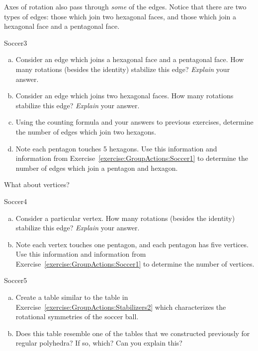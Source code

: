 Axes of rotation also pass through \emph{some} of the edges. Notice that there are two types of edges: those which join two hexagonal faces, and those which join a hexagonal face and a pentagonal face.

\begin{exercise}{Soccer3}
\begin{enumerate}[(a)]
\item
Consider an edge which joins a hexagonal face and a pentagonal face. How many rotations (besides the identity) stabilize this edge?  \emph{Explain} your answer.
\item
Consider an edge which joins two hexagonal faces. How many rotations stabilize this edge?  \emph{Explain} your answer.
\item
Using the counting formula and your answers to previous exercises, determine the number of edges which join  two hexagons.
\item
Note each pentagon touches 5 hexagons. Use this information and information from Exercise~\ref{exercise:GroupActions:Soccer1} to determine the number of edges which join a pentagon and hexagon.
\end{enumerate}
\end {exercise}

What about vertices?

\begin{exercise}{Soccer4}
\begin{enumerate}[(a)]
\item
Consider a particular vertex. How many rotations (besides the identity) stabilize this edge?  \emph{Explain} your answer.
\item
Note each vertex touches one pentagon, and each pentagon has five vertices. Use this information and information from Exercise~\ref{exercise:GroupActions:Soccer1} to determine the number of vertices.
\end{enumerate}
\end {exercise}

\begin{exercise}{Soccer5}
\begin{enumerate}[(a)]
\item
Create a table similar to the table in Exercise~\ref{exercise:GroupActions:Stabilizers2} which characterizes the rotational symmetries of the soccer ball.
\item
Does this table resemble one of the tables that we constructed previously for regular polyhedra? If so, which? Can you explain this?
\end{enumerate}
\end {exercise}

